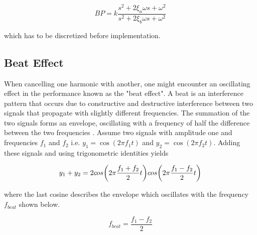 \begin{equation}
  \label{eq:bandpass}
  BP = k\frac{s^2 + 2\xi_a\omega s + \omega^2}{s^2 + 2\xi_b\omega s + \omega^2}
\end{equation}

which has to be discretized before implementation.
\newpage
\subsection{Beat Effect}\label{subsec:beat}
When cancelling one harmonic with another, one might encounter an oscillating effect in the performance known as the "beat effect".
A beat is an interference pattern that occurs due to constructive and destructive interference between two signals that propagate with slightly different frequencies. The summation of the two signals forms an envelope, oscillating with a frequency of half the difference between the two frequencies \citep{beat:2016}. Assume two signals with amplitude one and frequencies $f_1$ and $f_2$ i.e. $y_1 = \cos(2\pi f_1t)$ and $y_2 = \cos(2\pi f_2t)$. Adding these signals and using trigonometric identities yields

\begin{equation}
  y_1 + y_2 = 2cos\bigg(2\pi\frac{f_1+f_2}{2}t\bigg)cos\bigg(2\pi\frac{f_1-f_2}{2}t\bigg)
  \vspace{0.3cm}
\end{equation}

where the last cosine describes the envelope which oscillates with the frequency $f_{beat}$ shown below.

\begin{equation}
  \label{eq:beat}
  f_{beat} = \frac{f_1-f_2}{2}
\end{equation}
